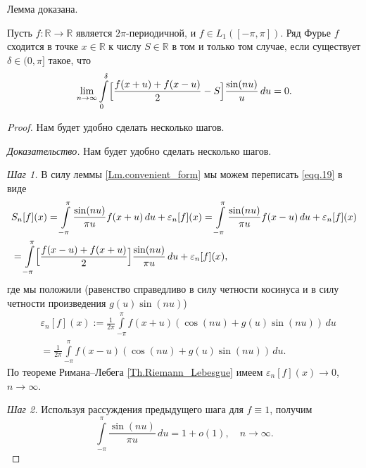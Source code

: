 Лемма доказана.

\begin{theorem}
	\label{Th.abstract_criterion}
	Пусть $f:\mathbb{R} \to \mathbb{R}$ является $2\pi$-периодичной, и $f \in L_{1}([-\pi,\pi])$.
	Ряд Фурье $f$ сходится в точке $x \in \mathbb{R}$ к числу $S \in \mathbb{R}$ в том и только том случае, если существует $\delta \in (0,\pi]$ такое, что
	\begin{equation}
		\label{eqq.22}
		\lim\limits_{n \to \infty}\int\limits_{0}^{\delta}\Bigl[\frac{f(x+u)+f(x-u)}{2}-S\Bigr]\frac{\sin(nu)}{u}\,du = 0.
	\end{equation}
\end{theorem}
\begin{proof} Нам будет удобно сделать несколько шагов.

\textit{Доказательство.} Нам будет удобно сделать несколько шагов.

\textit{Шаг 1.}
В силу леммы \ref{Lm.convenient_form}  мы можем переписать \eqref{eqq.19} в виде
\begin{equation}
	\label{eqq.23}
	\begin{split}
		&S_{n}[f](x)=\int\limits_{-\pi}^{\pi}\frac{\sin(nu)}{\pi u}f(x+u)\,du + \varepsilon_{n}[f](x) = \int\limits_{-\pi}^{\pi}\frac{\sin(nu)}{\pi u}f(x-u)\,du + \varepsilon_{n}[f](x)\\
		&=\int\limits_{-\pi}^{\pi}\Bigl[\frac{f(x-u)+f(x+u)}{2}\Bigr]\frac{\sin(nu)}{\pi u}\,du + \varepsilon_{n}[f](x),
	\end{split}
\end{equation}
где мы положили (равенство справедливо в силу четности косинуса и в силу четности произведения $g(u)\sin(nu)$)
\begin{equation}
	\label{eqq.24}
	\begin{split}
		&\varepsilon_{n}[f](x):=\frac{1}{2\pi}\int\limits_{-\pi}^{\pi}f(x+u)(\cos(nu)+g(u)\sin(nu))\,du\\
		&=\frac{1}{2\pi}\int\limits_{-\pi}^{\pi}f(x-u)(\cos(nu)+g(u)\sin(nu))\,du.
	\end{split}
\end{equation}
По теореме Римана--Лебега \ref{Th.Riemann_Lebesgue} имеем $\varepsilon_{n}[f](x) \to 0$, $n \to \infty$.

\textit{Шаг 2.} Используя рассуждения предыдущего шага для $f \equiv 1$, получим
\begin{equation}
	\label{eqq.25}
	\int\limits_{-\pi}^{\pi}\frac{\sin(nu)}{\pi u}\,du = 1 + o(1), \quad n \to \infty.
\end{equation}


\end{proof}
